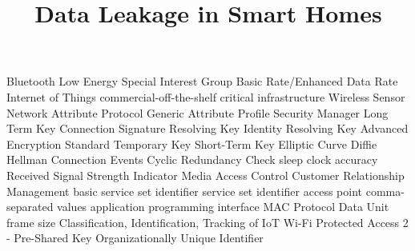 \documentclass[conference]{./IEEEtran/IEEEtran}
\begin{document}
	\begin{acronym}
		 {Bluetooth Low Energy}
		 {Special Interest Group}
		 {Basic Rate/Enhanced Data Rate}
		 {Internet of Things}
		 {commercial-off-the-shelf}
		 {critical infrastructure}
		 {Wireless Sensor Network}
		 {Attribute Protocol}
		 {Generic Attribute Profile}
		 {Security Manager}
		 {Long Term Key}
		 {Connection Signature Resolving Key}
		 {Identity Resolving Key}
		 {Advanced Encryption Standard}
		 {Temporary Key}
		 {Short-Term Key}
		 {Elliptic Curve Diffie Hellman}
		 {Connection Events}
		 {Cyclic Redundancy Check}
		 {sleep clock accuracy}
		 {Received Signal Strength Indicator}
		 {Media Access Control}
		 {Customer Relationship Management}
		 {basic service set identifier}
		 {service set identifier}
		 {access point}
		 {comma-separated values}
		 {application programming interface}
		 {\ac{MAC} Protocol Data Unit}
		 {frame size}
		 {Classification, Identification, Tracking of IoT}
		 {Wi-Fi Protected Access 2 - Pre-Shared Key}
		 {Organizationally Unique Identifier}
	\end{acronym}
\title{Data Leakage in Smart Homes}

\author{
	\and
	\and
	}

\maketitle
\end{document}
